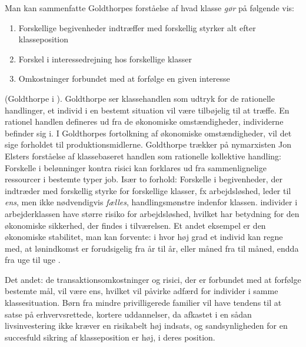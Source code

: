 Man kan sammenfatte Goldthorpes forståelse af hvad klasse \emph{gør} på følgende vis: 
%
\begin{enumerate}
 \itemsep-0.3em 		
 	\item Forskellige begivenheder indtræffer med forskellig styrker alt efter klasseposition
 	\item Forskel i interessedrejning hos forskellige klasser
 	\item Omkostninger forbundet med at forfølge en given interesse
\end{enumerate}
%
(Goldthorpe i \parencite[93]{Harrits2014}). Goldthorpe ser klassehandlen som  udtryk for de rationelle handlinger, et individ i en bestemt situation vil være tilbøjelig til at træffe. En rationel handlen defineres ud fra de økonomiske omstændigheder, individerne befinder sig i. I Goldthorpes fortolkning af økonomiske omstændigheder, vil det sige forholdet til produktionsmidlerne. Goldthorpe trækker på nymarxisten Jon Elsters forståelse af klassebaseret handlen som rationelle kollektive handling: Forskelle i belønninger kontra risici kan forklares ud fra sammenlignelige ressourcer i bestemte typer job. Især to forhold: Forskelle i begivenheder, der indtræder med forskellig styrke for forskellige klasser, fx arbejdsløshed, leder til \emph{ens}, men ikke nødvendigvis \emph{fælles}, handlingsmønstre indenfor klassen. individer i arbejderklassen have større risiko for arbejdsløshed, hvilket har betydning for den økonomiske sikkerhed, der findes i tilværelsen. Et andet eksempel er den økonomiske stabilitet, man kan forvente: i hvor høj grad et individ kan regne med, at lønindkomst er forudsigelig fra år til år, eller måned fra til måned, endda fra uge til uge \parencite[6, 10]{GoldthorpeMcKnight2004}.

Det andet: de transaktionsomkostninger og risici, der er forbundet med at forfølge bestemte mål, vil være ens, hvilket vil påvirke adfærd for individer i samme klassesituation. Børn fra mindre privilligerede familier vil have tendens til at satse på erhvervsrettede, kortere uddannelser, da afkastet i en sådan livsinvestering ikke kræver en risikabelt høj indsats, og sandsynligheden for en succesfuld sikring af klasseposition er høj, i deres position. 


